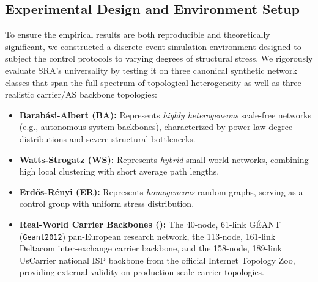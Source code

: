 \documentclass[journal]{IEEEtran}
\theoremstyle{plain}
\theoremstyle{definition}
\newcommand{\rev}[1]{{\color{blue}#1}}
\begin{document}
\subsection{Experimental Design and Environment Setup}
\label{subsec:sim_setup}

To ensure the empirical results are both reproducible and theoretically significant, we constructed a discrete-event simulation environment designed to subject the control protocols to varying degrees of structural stress.
We rigorously evaluate SRA's universality by testing it on three canonical synthetic network classes that span the full spectrum of topological heterogeneity \rev{as well as three realistic carrier/AS backbone topologies}:
\begin{itemize}
    \item \textbf{Barabási-Albert (BA):} Represents \textit{highly heterogeneous} scale-free networks (e.g., autonomous system backbones), characterized by power-law degree distributions and severe structural bottlenecks.
    \item \textbf{Watts-Strogatz (WS):} Represents \textit{hybrid} small-world networks, combining high local clustering with short average path lengths.
    \item \textbf{Erd\H{o}s-Rényi (ER):} Represents \textit{homogeneous} random graphs, serving as a control group with uniform stress distribution.
    \item \rev{\textbf{Real-World Carrier Backbones (\cite{Knight2011TopologyZoo}):} The 40-node, 61-link G\'EANT (\texttt{Geant2012}) pan-European research network, the 113-node, 161-link Deltacom inter-exchange carrier backbone, and the 158-node, 189-link UsCarrier national ISP backbone from the official Internet Topology Zoo, providing external validity on production-scale carrier topologies.}
\end{itemize}
\end{document}
